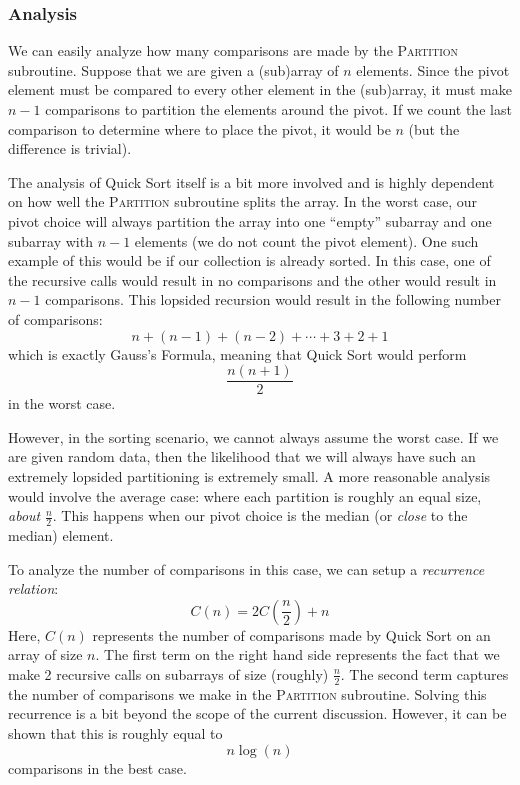 



\subsubsection{Analysis}

We can easily analyze how many comparisons are made by the \textsc{Partition}
subroutine.  Suppose that we are given a (sub)array of $n$ elements.  Since 
the pivot element must be compared to every other element in the (sub)array, 
it must make $n-1$ comparisons to partition the elements around the pivot.
If we count the last comparison to determine where to place the pivot, it 
would be $n$ (but the difference is trivial).  

The analysis of Quick Sort itself is a bit more involved and is highly
dependent on how well the \textsc{Partition} subroutine splits the
array.  In the worst case, our pivot choice will always partition the
array into one ``empty'' subarray and one subarray with $n-1$ elements
(we do not count the pivot element).  One such example of this would
be if our collection is already sorted.  In this case, one of the
recursive calls would result in no comparisons and the other would result
in $n-1$ comparisons.  This lopsided recursion would result in the
following number of comparisons:
$$n + (n-1) + (n-2) + \cdots + 3 + 2 + 1$$
which is exactly Gauss's Formula, meaning that Quick Sort would perform
$$\frac{n(n+1)}{2}$$
in the worst case.

However, in the sorting scenario, we cannot always assume the worst case.
If we are given random data, then the likelihood that we will always have
such an extremely lopsided partitioning is extremely small.  A more reasonable
analysis would involve the average case: where each partition is roughly an
equal size, \emph{about} $\frac{n}{2}$.  This happens when our pivot
choice is the median (or \emph{close} to the median) element.

To analyze the number of comparisons in this case, we can setup a 
\emph{recurrence relation}:
  $$C(n) = 2C\left( \frac{n}{2} \right) + n$$
Here, $C(n)$ represents the number of comparisons made by Quick Sort
on an array of size $n$.  The first term on the right hand side represents
the fact that we make 2 recursive calls on subarrays of size (roughly)
$\frac{n}{2}$.  The second term captures the number of comparisons we
make in the \textsc{Partition} subroutine.  Solving this recurrence is
a bit beyond the scope of the current discussion.  However, it can be
shown that this is roughly equal to 
  $$n\log{(n)}$$
comparisons in the best case.  

